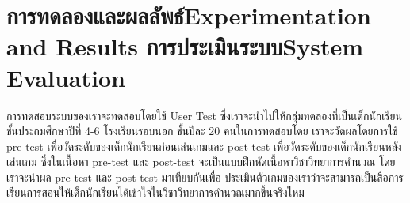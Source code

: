 \chapter{\ifproject%
\ifcpe การทดลองและผลลัพธ์\else Experimentation and Results\fi
\else%
\ifcpe การประเมินระบบ\else System Evaluation\fi
\fi}

การทดสอบระบบของเราจะทดสอบโดยใช้ User Test ซึ่งเราจะนำไปให้กลุ่มทดลองที่เป็นเด็กนักเรียนชั้นประถมศึกษาปีที่ 4-6 โรงเรียนรอบนอก
ชั้นปีละ 20 คนในการทดสอบโดย เราจะวัดผลโดยการใช้ pre-test เพื่อวัดระดับของเด็กนักเรียนก่อนเล่นเกมและ post-test เพื่อวัดระดับของเด็กนักเรียนหลังเล่นเกม
ซึ่งในเนื้อหา pre-test และ post-test จะเป็นแบบฝึกหัดเนื้อหาวิชาวิทยาการคำนวณ โดยเราจะนำผล pre-test และ post-test มาเทียบกันเพื่อ
ประเมินตัวเกมของเราว่าจะสามารถเป็นสื่อการเรียนการสอนให้เด็กนักเรียนได้เข้าใจในวิชาวิทยาการคำนวณมากขึ้นจริงไหม 
